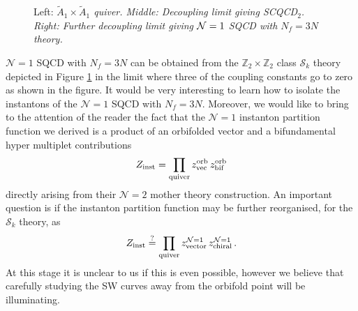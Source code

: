\documentclass[main.tex]{subfiles}
\begin{document}
\begin{figure}
  \caption{\normalfont Left: \it $\tilde{A}_1\times\tilde{A}_1$ quiver. \normalfont Middle: \it Decoupling limit giving SCQCD$_2$. \normalfont Right: \it  Further decoupling limit giving $\mathcal{N}=1$ SQCD with $N_f=3N$ theory.}\label{fig:SQCDlimit}
\end{figure}
$\mathcal{N}=1$ SQCD with $N_f=3N$ can be obtained from the $\mathbb{Z}_2 \times \mathbb{Z}_2$ class $\mathcal{S}_k$ theory depicted in Figure \ref{fig:SQCDlimit} in the limit where three of the coupling constants go to zero as shown in the figure. It would be very interesting to learn how to isolate the instantons of the $\mathcal{N}=1$ SQCD with $N_f=3N$.
Moreover, we would like to bring to the attention of the reader the fact that the $\mathcal{N}=1$ instanton partition function we derived is a product of an orbifolded vector and a bifundamental hyper multiplet contributions
\begin{equation}
Z_{\text{inst}} = \prod_{\text{quiver}}  z^{\text{orb}}_{\text{vec}} \,  z^{\text{orb}}_{\text{bif}}
\end{equation}
directly arising from their $\mathcal{N}=2$ mother theory construction.
An important question is if the instanton partition function  may be further reorganised, for the $\mathcal{S}_k$ theory, as
\begin{equation}
Z_{\text{inst}} \stackrel{?}{=} \prod_{\text{quiver}}  z^{\mathcal{N}=1}_{\text{vector}} \, z^{\mathcal{N}=1}_{\text{chiral}} \, .
\end{equation}
At this stage it is unclear to us if this is even possible, however we believe that carefully studying the SW curves away from the orbifold point will be illuminating.
\end{document}
